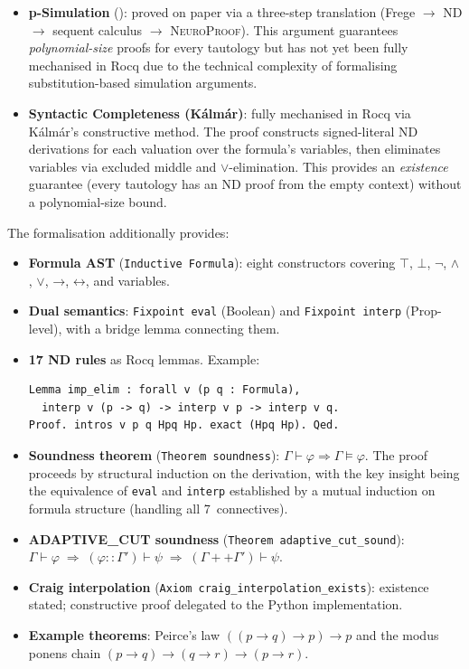\documentclass[conference]{IEEEtran}
\newcommand{\entails}{\vDash}
\newcommand{\proves}{\vdash}
\newcommand{\dland}{\mathbin{\wedge}}
\newcommand{\dlor}{\mathbin{\vee}}
\newcommand{\dlnot}{\neg}
\newcommand{\dlimp}{\mathbin{\to}}
\newcommand{\dliff}{\mathbin{\leftrightarrow}}
\newcommand{\dlbot}{\bot}
\newcommand{\dltop}{\top}
\newcommand{\NP}{\textsc{NeuroProof}}
\begin{document}
\begin{itemize}
  \item \textbf{p-Simulation} (): proved on
    paper via a three-step translation (Frege $\to$ ND $\to$ sequent
    calculus $\to$ \NP{}).  This argument guarantees
    \emph{polynomial-size} proofs for every tautology but has not
    yet been fully mechanised in Rocq due to the technical complexity
    of formalising substitution-based simulation arguments.
  \item \textbf{Syntactic Completeness (K\'{a}lm\'{a}r)}: fully
    mechanised in Rocq via K\'{a}lm\'{a}r's constructive method.
    The proof constructs signed-literal ND derivations for each
    valuation over the formula's variables, then eliminates variables
    via excluded middle and $\lor$-elimination.  This provides an
    \emph{existence} guarantee (every tautology has an ND proof from
    the empty context) without a polynomial-size bound.
\end{itemize}

The formalisation additionally provides:

\begin{itemize}
  \item \textbf{Formula AST} (\texttt{Inductive Formula}): eight
    constructors covering $\dltop$, $\dlbot$, $\dlnot$, $\dland$,
    $\dlor$, $\dlimp$, $\dliff$, and variables.
  \item \textbf{Dual semantics}:
    \texttt{Fixpoint eval} (Boolean) and \texttt{Fixpoint interp}
    (Prop-level), with a bridge lemma connecting them.
  \item \textbf{17 ND rules} as Rocq lemmas.  Example:
    \begin{lstlisting}[gobble=4]
Lemma imp_elim : forall v (p q : Formula),
  interp v (p -> q) -> interp v p -> interp v q.
Proof. intros v p q Hpq Hp. exact (Hpq Hp). Qed.
    \end{lstlisting}
  \item \textbf{Soundness theorem}
    (\texttt{Theorem soundness}):
    $\Gamma \proves \varphi \Rightarrow \Gamma \entails \varphi$.
    The proof proceeds by structural induction on the derivation,
    with the key insight being the equivalence of \texttt{eval} and
    \texttt{interp} established by a mutual induction on formula
    structure (handling all 7~connectives).
  \item \textbf{ADAPTIVE\_CUT soundness}
    (\texttt{Theorem adaptive\_cut\_sound}):
    $\Gamma \proves \varphi \;\Rightarrow\;
    (\varphi :: \Gamma') \proves \psi
    \;\Rightarrow\;
    (\Gamma ++ \Gamma') \proves \psi$.
  \item \textbf{Craig interpolation}
    (\texttt{Axiom craig\_interpolation\_exists}):
    existence stated; constructive proof delegated to the Python
    implementation.
  \item \textbf{Example theorems}: Peirce's law
    $((p \to q) \to p) \to p$ and the modus ponens chain
    $(p \to q) \to (q \to r) \to (p \to r)$.
\end{itemize}
\end{document}
